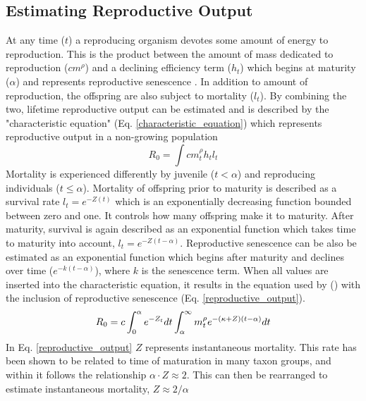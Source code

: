 \documentclass[a4paper, 11pt, hidelinks]{article} %
\begin{document}
	
	
	\subsection{Estimating Reproductive Output}
	At any time ($ t $) a reproducing organism devotes some amount of energy to reproduction.  This is the product between the amount of mass dedicated to reproduction ($ cm^\rho $) and a declining efficiency term ($ h_t $) which begins at maturity ($ \alpha $) and represents reproductive senescence \parencite{Benoit2018, Vrtilek2018, Stearns2000}.  In addition to amount of reproduction, the offspring are also subject to mortality ($ l_t $).  By combining the two, lifetime reproductive output can be estimated and is described by the "characteristic equation" (Eq. \ref{characteristic_equation}) which represents reproductive output in a non-growing population \parencite{Tsoukali2016, roff1993, Roff2001, stearns1992evolution, Arendt2011, Roff1986, Roff1984}
	\begin{equation}
		\label{characteristic_equation}
		R_0 = \int c m_t^\rho h_t l_t 
	\end{equation}
	Mortality is experienced differently by juvenile ($ t < \alpha $) and reproducing individuals ($ t \leq \alpha $). %
	Mortality of offspring prior to maturity is described as a survival rate $ l_t = e^{-Z(t)} $ which is an exponentially decreasing function bounded between zero and one.  It controls how many offspring make it to maturity.  After maturity, survival is again described as an exponential function which takes time to maturity into account, $ l_t = e^{-Z(t-\alpha)} $.  
	Reproductive senescence can be also be estimated as an exponential function which begins after maturity and declines over time  ($ e^{-k(t-\alpha)} $), where $ k $ is the senescence term.  When all values are inserted into the characteristic equation, it results in the equation used by \citeauthor{Charnov2001} (\citeyear{Charnov2001}) with the inclusion of reproductive senescence (Eq. \ref{reproductive_output}).
	\begin{equation}
		\label{reproductive_output}
		R_0 = c\int_0^\alpha e^{-Z_t} dt  \int_\alpha^\infty m_t^\rho e^{-(\kappa + Z)(t - \alpha)}dt\\
	\end{equation} 
	In Eq. \ref{reproductive_output} $ Z $ represents instantaneous mortality.  This rate has been shown to be related to time of maturation in many taxon groups, and within it follows the relationship $ \alpha \cdot Z \approx  2$.  This can then be rearranged to estimate instantaneous mortality, $ Z \approx 2/\alpha  $
	
\end{document}
